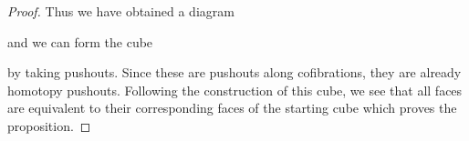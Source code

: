\begin{lemma}
\begin{proof}
        Thus we have obtained a diagram
        \begin{center}
        \end{center}
        and we can form the cube 
        \begin{center}
        \end{center}
        by taking pushouts.
        Since these are pushouts along cofibrations, they are already homotopy pushouts. 
        Following the construction of this cube, we see that all faces are equivalent to their corresponding faces of the starting cube which proves the proposition.
    \end{proof}
\end{lemma}
